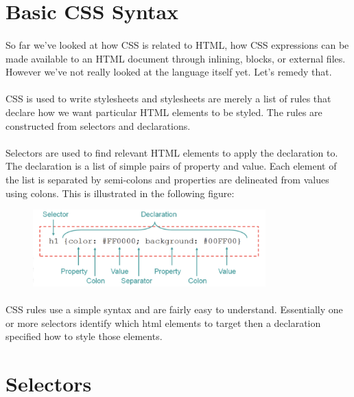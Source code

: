 \section{Basic CSS Syntax}
\paragraph{} So far we've looked at how CSS is related to HTML, how CSS expressions can be made available to an HTML document through inlining, blocks, or external files. However we've not really looked at the language itself yet. Let's remedy that.
\paragraph{} CSS is used to write stylesheets and stylesheets are merely a list of rules that declare how we want particular HTML elements to be styled. The rules are constructed from selectors and declarations.
\paragraph{} Selectors are used to find relevant HTML elements to apply the declaration to. The declaration is a list of simple pairs of property and value. Each element of the list is separated by semi-colons and properties are delineated from values using colons. This is illustrated in the following figure:


\begin{figure}[H]
\centering
\includegraphics[width=0.8\textwidth]{figures/css-syntax}
\label{fig:css-syntax}
\caption{}
\end{figure}


\paragraph{} CSS rules use a simple syntax and are fairly easy to understand. Essentially one or more selectors identify which html elements to target then a declaration specified how to style those elements.


\section{Selectors}
